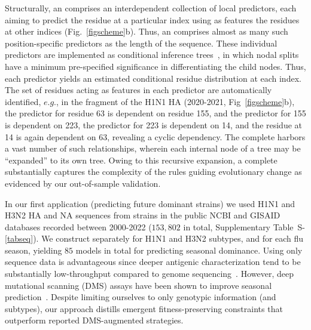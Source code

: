 \documentclass[onecolumn, compsoc,10pt]{IEEEtran}
\def\SUPPLEMENTARY{Supplementary\xspace}
\begin{document}
Structurally, an \enet comprises an interdependent collection of  local predictors, each aiming to predict the  residue at a particular index  using as features  the residues   at other  indices  (Fig.~\ref{figscheme}b). Thus,  an \enet comprises almost as many such  position-specific predictors as the length of the sequence. These individual predictors are implemented as conditional inference trees~\cite{Hothorn06unbiasedrecursive}, in which  nodal splits  have  a minimum pre-specified significance in differentiating the  child nodes. Thus, each predictor yields an estimated conditional residue distribution  at each index. The set of residues acting as features in each predictor are automatically identified, $e.g.$, in the fragment of the  H1N1 HA \enet (2020-2021, Fig~\ref{figscheme}b), the predictor for residue 63 is dependent on   residue  155, and the predictor for  155 is dependent on  223, the predictor for  223 is dependent on  14, and the residue at  14 is again dependent on  63, revealing a cyclic dependency. The complete \enet harbors a vast number of such  relationships, wherein each internal node of a tree may be  ``expanded'' to its own tree. Owing to this recursive expansion,  a complete \enet substantially captures the complexity of the rules guiding evolutionary change as evidenced by our out-of-sample validation.

In our first application (predicting future dominant strains) we used  H1N1 and H3N2 HA and NA  sequences from \infl strains in the public NCBI and GISAID databases recorded between 2000-2022 ($153,802$ in total, \SUPPLEMENTARY Table~S-\ref{tabseq}). We  construct  separately for H1N1 and H3N2 subtypes, and for each flu season, yielding $85$ models in total for predicting seasonal dominance. Using only sequence data is advantageous since deeper antigenic characterization  tend to be substantially  low-throughput compared to genome sequencing~\cite{wood2012reproducibility}. However,   deep mutational scanning (DMS) assays  have been shown to improve seasonal prediction~\cite{huddleston2020integrating}. Despite limiting ourselves to only genotypic  information (and subtypes), our approach  distills  emergent  fitness-preserving constraints   that outperform reported DMS-augmented strategies.
\end{document}
